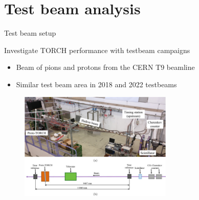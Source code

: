 \documentclass[xcolor={dvipsnames}]{beamer}
\begin{document}
\section{Test beam analysis}
\begin{frame}{Test beam setup}
  \vspace{0.0cm}
  \begin{center}
    {\large Investigate TORCH performance with testbeam campaigns}
  \end{center}  
  \begin{itemize}
    \setlength\itemsep{0.3em}
    \item{Beam of pions and protons from the CERN T9 beamline}
    \item{Similar test beam area in 2018 and 2022 testbeams}
  \end{itemize}
  \begin{figure}
    \centering
    \includegraphics[width = 0.65\textwidth]{Figs/TORCH_testbeam_2018_setup.jpg}
  \end{figure}
\end{frame}
\end{document}
